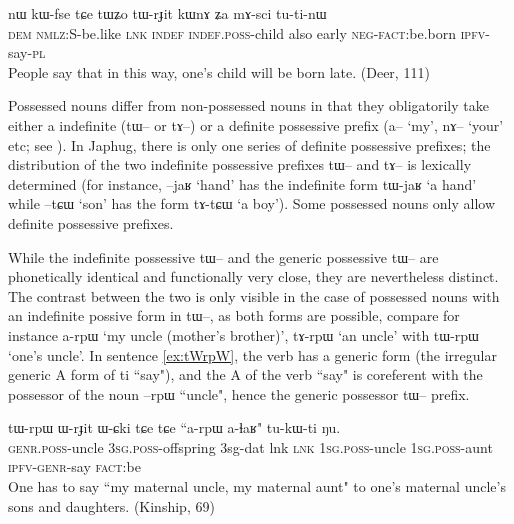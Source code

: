 \documentclass[oldfontcommands,oneside,a4paper,11pt]{article}
\newcommand{\ipa}[1]{{\phon \mbox{#1}}} %
\begin{document}
\begin{exe}
\ex
\gll
\ipa{nɯ} 	\ipa{kɯ-fse} 	\ipa{tɕe} 	\ipa{tɯʑo} 	\ipa{tɯ-rɟit} 	\ipa{kɯnɤ} 	\ipa{ʑa} 	\ipa{mɤ-sci} 	\ipa{tu-ti-nɯ} \\
\textsc{dem} \textsc{nmlz}:S-be.like \textsc{lnk} \textsc{indef} \textsc{indef.poss}-child also early \textsc{neg-fact}:be.born \textsc{ipfv}-say-\textsc{pl} \\
\glt People say that in this way, one's child will be born late. (Deer, 111)
\end{exe}



Possessed nouns differ from non-possessed nouns in that they obligatorily take either a indefinite  (\ipa{tɯ--} or \ipa{tɤ--})  or a definite possessive prefix (\ipa{a--} `my', \ipa{nɤ--} `your' etc; see \citealt{jacques14antipassive}). In Japhug, there is only one series of definite possessive prefixes; the distribution of the two indefinite possessive prefixes \ipa{tɯ--} and \ipa{tɤ--} is lexically determined (for instance, \ipa{--jaʁ} `hand' has the indefinite form \ipa{tɯ-jaʁ} `a hand' while \ipa{--tɕɯ} `son' has the form \ipa{tɤ-tɕɯ} `a boy'). Some possessed nouns only allow definite possessive prefixes.

While the indefinite possessive \ipa{tɯ--} and the generic possessive \ipa{tɯ--} are phonetically identical and functionally very close, they are nevertheless distinct. The contrast between the two is only visible in the case of possessed nouns with an indefinite possive form in \ipa{tɯ--}, as both forms are possible, compare for instance \ipa{a-rpɯ} `my uncle (mother's brother)', \ipa{tɤ-rpɯ} `an uncle' with \ipa{tɯ-rpɯ} `one's uncle'. In sentence \ref{ex:tWrpW}, the verb has a generic form (the irregular generic A form of \ipa{ti} ``say"), and the A of the verb ``say" is coreferent with the possessor of the noun   \ipa{--rpɯ}  ``uncle", hence the generic possessor \ipa{tɯ--} prefix.

\begin{exe}
\ex \label{ex:tWrpW}
\gll
 \ipa{tɯ-rpɯ} 	\ipa{ɯ-rɟit} 	\ipa{ɯ-ɕki} 	\ipa{tɕe} 	\ipa{tɕe} 	``\ipa{a-rpɯ} \ipa{a-ɬaʁ}" 	\ipa{tu-kɯ-ti} 	\ipa{ŋu.} \\
\textsc{genr.poss}-uncle \textsc{3sg.poss}-offspring 3sg-dat lnk \textsc{lnk} \textsc{1sg.poss}-uncle \textsc{1sg.poss}-aunt \textsc{ipfv-genr}-say \textsc{fact}:be \\
\glt One has to say ``my maternal uncle, my maternal aunt" to one's maternal uncle's sons and daughters. (Kinship, 69)
\end{exe}
\end{document}
